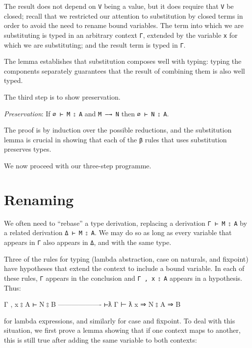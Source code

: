 The result does not depend on \texttt{V} being a value, but it does
require that \texttt{V} be closed; recall that we restricted our
attention to substitution by closed terms in order to avoid the need to
rename bound variables. The term into which we are substituting is typed
in an arbitrary context \texttt{Γ}, extended by the variable \texttt{x}
for which we are substituting; and the result term is typed in
\texttt{Γ}.

The lemma establishes that substitution composes well with typing:
typing the components separately guarantees that the result of combining
them is also well typed.

The third step is to show preservation.

\emph{Preservation}: If \texttt{∅\ ⊢\ M\ ⦂\ A} and \texttt{M\ —→\ N}
then \texttt{∅\ ⊢\ N\ ⦂\ A}.

The proof is by induction over the possible reductions, and the
substitution lemma is crucial in showing that each of the \texttt{β}
rules that uses substitution preserves types.

We now proceed with our three-step programme.

\hypertarget{renaming}{%
\section{Renaming}\label{renaming}}

We often need to ``rebase'' a type derivation, replacing a derivation
\texttt{Γ\ ⊢\ M\ ⦂\ A} by a related derivation \texttt{Δ\ ⊢\ M\ ⦂\ A}.
We may do so as long as every variable that appears in \texttt{Γ} also
appears in \texttt{Δ}, and with the same type.

Three of the rules for typing (lambda abstraction, case on naturals, and
fixpoint) have hypotheses that extend the context to include a bound
variable. In each of these rules, \texttt{Γ} appears in the conclusion
and \texttt{Γ\ ,\ x\ ⦂\ A} appears in a hypothesis. Thus:

\begin{myDisplay}
Γ , x ⦂ A ⊢ N ⦂ B
------------------- ⊢ƛ
Γ ⊢ ƛ x ⇒ N ⦂ A ⇒ B
\end{myDisplay}

for lambda expressions, and similarly for case and fixpoint. To deal
with this situation, we first prove a lemma showing that if one context
maps to another, this is still true after adding the same variable to
both contexts:

